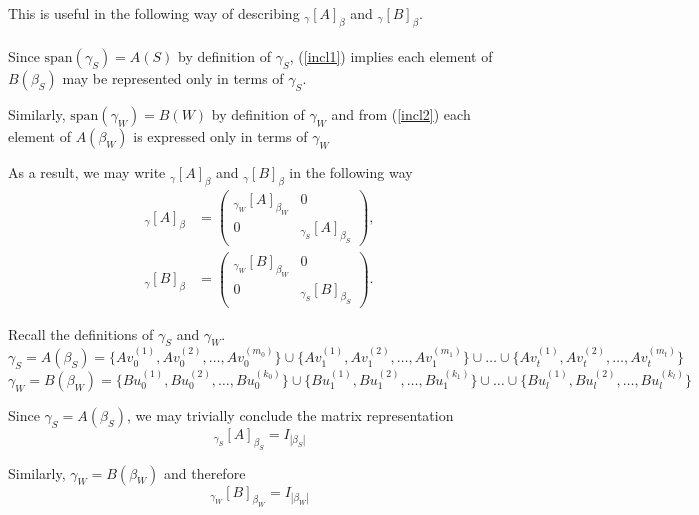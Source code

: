 This is useful in the following way of describing $_{\gamma}[A]_{\beta}$ and $_{\gamma}[B]_{\beta}$.\\ \\
Since $\text{span}(\gamma_S)=A(S)$ by definition of $\gamma_S$, (\ref{incl1}) implies each element of $B(\beta_S)$ may be represented only in terms of $\gamma_S$.

Similarly, $\text{span}(\gamma_W)=B(W)$ by definition of $\gamma_W$ and from (\ref{incl2}) each element of $A(\beta_W)$ is expressed only in terms of $\gamma_W$

As a result, we may write ${}_{\gamma}[A]_{\beta}$ and ${}_{\gamma}[B]_{\beta}$ in the following way
\begin{equation}\label{begginingoftheend}
    \begin{aligned}
{}_{\gamma}[A]_{\beta}
&=
\begin{pmatrix}
_{\gamma_W}[A]_{\beta_W} & 0\\
0 & _{\gamma_S}[A]_{\beta_S}
\end{pmatrix},
\\[1em]
{}_{\gamma}[B]_{\beta}
&=
\begin{pmatrix}
_{\gamma_W}[B]_{\beta_W} & 0\\
0 & _{\gamma_S}[B]_{\beta_S}
\end{pmatrix}.
\end{aligned}
\end{equation}


Recall the definitions of $\gamma_S$ and $\gamma_W$.
\begin{equation*}
\gamma_S=A(\beta_S)=\{Av_{0}^{(1)},Av_{0}^{(2)},\dots,Av_{0}^{(m_0)}\} \cup \{Av_{1}^{(1)},Av_{1}^{(2)},\dots,Av_{1}^{(m_1)}\} \cup \dots \cup \{Av_{t}^{(1)},Av_{t}^{(2)},\dots,Av_{t}^{(m_t)}\}
 \end{equation*}
 \begin{equation*}
\gamma_W=B(\beta_W)=\{Bu_{0}^{(1)},Bu_{0}^{(2)},\dots,Bu_{0}^{(k_0)}\} \cup \{Bu_{1}^{(1)},Bu_{1}^{(2)},\dots,Bu_{1}^{(k_1)}\} \cup \dots \cup \{Bu_{l}^{(1)},Bu_{l}^{(2)},\dots,Bu_{l}^{(k_l)}\} 
 \end{equation*}
 
Since $\gamma_S=A(\beta_S)$, we may trivially conclude the matrix representation
\begin{equation}\label{!1}
{}_{\gamma_S}[A]_{\beta_S}=I_{|\beta_S|}
\end{equation}


Similarly, $\gamma_W=B(\beta_W)$ and therefore 
\begin{equation}\label{!2}
_{\gamma_W}[B]_{\beta_W}=I_{|\beta_W|}
\end{equation}

